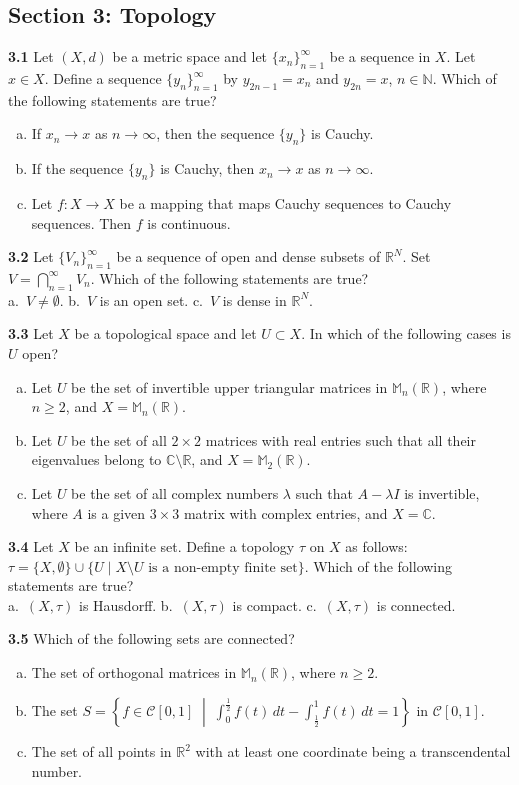 \documentclass[11pt,a4paper]{article}
\newcommand{\N}{\mathbb{N}}
\newcommand{\R}{\mathbb{R}}
\newcommand{\C}{\mathbb{C}}
\newcommand{\M}{\mathbb{M}}
\newcommand{\examsec}[1]{%
  \subsection*{#1}
  \vspace{-2pt}
}
\newcommand{\qitem}[1]{\par\medskip\noindent\textbf{#1}\hspace{0.5em}}
\begin{document}
\examsec{Section 3: Topology}

\qitem{3.1} Let $(X, d)$ be a metric space and let $\{x_n\}_{n=1}^{\infty}$ be a sequence in $X$. Let $x \in X$. Define a sequence $\{y_n\}_{n=1}^{\infty}$ by $y_{2n-1} = x_n$ and $y_{2n} = x$, $n \in \N$. Which of the following statements are true?
\begin{enumerate}[a.]
  \item If $x_n \to x$ as $n \to \infty$, then the sequence $\{y_n\}$ is Cauchy.
  \item If the sequence $\{y_n\}$ is Cauchy, then $x_n \to x$ as $n \to \infty$.
  \item Let $f : X \to X$ be a mapping that maps Cauchy sequences to Cauchy sequences. Then $f$ is continuous.
\end{enumerate}

\qitem{3.2} Let $\{V_n\}_{n=1}^{\infty}$ be a sequence of open and dense subsets of $\R^N$. Set $V = \bigcap_{n=1}^{\infty} V_n$. Which of the following statements are true?\\
a.\ $V \neq \emptyset$. \qquad b.\ $V$ is an open set. \qquad c.\ $V$ is dense in $\R^N$.

\qitem{3.3} Let $X$ be a topological space and let $U \subset X$. In which of the following cases is $U$ open?
\begin{enumerate}[a.]
  \item Let $U$ be the set of invertible upper triangular matrices in $\M_n(\R)$, where $n \ge 2$, and $X = \M_n(\R)$.
  \item Let $U$ be the set of all $2 \times 2$ matrices with real entries such that all their eigenvalues belong to $\C \setminus \R$, and $X = \M_2(\R)$.
  \item Let $U$ be the set of all complex numbers $\lambda$ such that $A - \lambda I$ is invertible, where $A$ is a given $3 \times 3$ matrix with complex entries, and $X = \C$.
\end{enumerate}

\qitem{3.4} Let $X$ be an infinite set. Define a topology $\tau$ on $X$ as follows: $\tau = \{X, \emptyset\} \cup \{U \mid X \setminus U \text{ is a non-empty finite set}\}$. Which of the following statements are true?\\
a.\ $(X, \tau)$ is Hausdorff. \qquad b.\ $(X, \tau)$ is compact. \qquad c.\ $(X, \tau)$ is connected.

\qitem{3.5} Which of the following sets are connected?
\begin{enumerate}[a.]
  \item The set of orthogonal matrices in $\M_n(\R)$, where $n \ge 2$.
  \item The set $S = \left\{f \in \mathcal{C}[0, 1] \;\middle|\; \int_0^{\frac{1}{2}} f(t)\,dt - \int_{\frac{1}{2}}^{1} f(t)\,dt = 1\right\}$ in $\mathcal{C}[0, 1]$.
  \item The set of all points in $\R^2$ with at least one coordinate being a transcendental number.
\end{enumerate}
\end{document}
